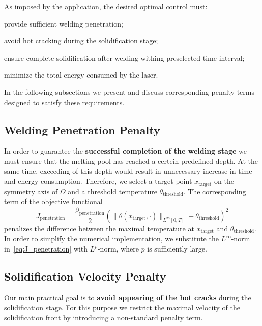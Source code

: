 As imposed by the application, the desired optimal control must:
\begin{enumeratearabic}
	\item provide sufficient welding penetration;
	\item avoid hot cracking during the solidification stage;
	\item ensure complete solidification after welding withing preselected time interval;
	\item minimize the total energy consumed by the laser.
\end{enumeratearabic}

In the following subsections we present and discuss corresponding penalty terms designed to satisfy these requirements.


\subsection{Welding Penetration Penalty}
\label{subsec:velocity}

In order to guarantee the \textbf{successful completion of the welding stage} we must ensure that the melting pool has reached a certein predefined depth. At the same time, exceeding of this depth would result in unnecessary increase in time and energy consumption. Therefore, we select a target point $x_{\text{target}}$ on the symmetry axis of $\Omega$ and a threshold temperature $\theta_{\text{threshold}}$. The corresponding term of the objective functional
\begin{equation} \label{eq:J_penetration}
	J_{\text{penetration}} = \frac{\beta_\text{penetration}}{2} \left( \| \theta(x_{\text{target}},\cdot) \|_{L^{\infty}[0,T]} - \theta_{\text{threshold}} \right)^2
\end{equation}
penalizes the difference between the maximal temperature at $x_{\text{target}}$ and $\theta_{\text{threshold}}$. In order to simplify the numerical implementation, we substitute the $L^{\infty}$-norm in~\eqref{eq:J_penetration} with $L^{p}$-norm, where $p$ is sufficiently large.


\subsection{Solidification Velocity Penalty}
\label{subsec:velocity}

Our main practical goal is to \textbf{avoid appearing of the hot cracks} during the solidification stage. For this purpose we restrict the maximal velocity of the solidification front by introducing a non-standard penalty term.

